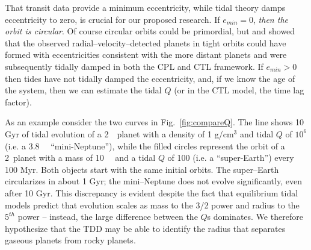 That transit data provide a minimum eccentricity, while tidal theory
damps eccentricity to zero, is crucial for our proposed research. If
$e_{min} = 0$, \textit{then the orbit is circular}.  Of course
circular orbits could be primordial, but \cite{Jackson08}
and \cite{Matsumura10} showed that the observed
radial--velocity--detected planets in tight orbits could have formed
with eccentricities consistent with the more distant planets and were
subsequently tidally damped in both the CPL and CTL framework.  If
$e_{min} > 0$ then tides have not tidally damped the eccentricity,
and, if we know the age of the system, then we can estimate the tidal
$Q$ (or in the CTL model, the time lag factor).

As an example consider the two curves in Fig.~\ref{fig:compareQ}.  The
line shows 10 Gyr of tidal evolution of a 2~\rearth~planet with a
density of 1 g/cm$^3$ and tidal $Q$ of $10^6$ (i.e. a 3.8~\mearth~
``mini-Neptune''), while the filled circles represent the orbit of a
2~\rearth planet with a mass of 10~\mearth~ and a tidal $Q$ of 100
(i.e. a ``super-Earth'') every 100 Myr.  Both objects start with the same initial orbits.  The super--Earth circularizes in
about 1 Gyr; the mini--Neptune does not evolve significantly, even
after 10 Gyr.  This discrepancy is evident despite the fact that
equilibrium tidal models predict that evolution scales as mass to the
3/2 power and radius to the $5^{th}$ power -- instead, the large
difference between the $Q$s dominates.  We therefore hypothesize that
the TDD may be able to identify the radius that separates gaseous
planets from rocky planets.


